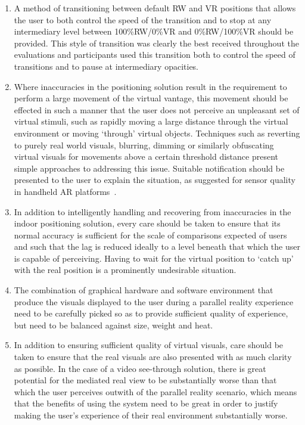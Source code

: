 \begin{enumerate}
	\item A method of transitioning between default RW and VR positions that allows the user to both control the speed of the transition and to stop at any intermediary level between 100\%RW/0\%VR and 0\%RW/100\%VR should be provided. This style of transition was clearly the best received throughout the evaluations and participants used this transition both to control the speed of transitions and to pause at intermediary opacities.
	\item Where inaccuracies in the positioning solution result in the requirement to perform a large movement of the virtual vantage, this movement should be effected in such a manner that the user does not perceive an unpleasant set of virtual stimuli, such as rapidly moving a large distance through the virtual environment or moving `through' virtual objects. Techniques such as reverting to purely real world visuals, blurring, dimming or similarly obfuscating virtual visuals for movements above a certain threshold distance present simple approaches to addressing this issue. Suitable notification should be presented to the user to explain the situation, as suggested for sensor quality in handheld AR platforms~\cite{Billinghurst2014}.


	\item In addition to intelligently handling and recovering from inaccuracies in the indoor positioning solution, every care should be taken to ensure that its normal accuracy is sufficient for the scale of comparisons expected of users and such that the lag is reduced ideally to a level beneath that which the user is capable of perceiving. Having to wait for the virtual position to `catch up' with the real position is a prominently undesirable situation.

	\item The combination of graphical hardware and software environment that produce the visuals displayed to the user during a parallel reality experience need to be carefully picked so as to provide sufficient quality of experience, but need to be balanced against size, weight and heat.
	

	\item In addition to ensuring sufficient quality of virtual visuals, care should be taken to ensure that the real visuals are also presented with as much clarity as possible. In the case of a video see-through solution, there is great potential for the mediated real view to be substantially worse than that which the user perceives outwith of the parallel reality scenario, which means that the benefits of using the system need to be great in order to justify making the user's experience of their real environment substantially worse.


\end{enumerate}

